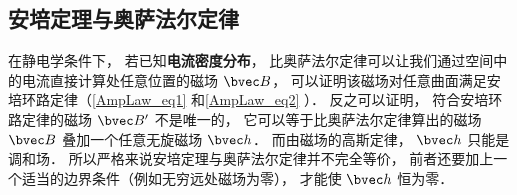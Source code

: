 \subsection{安培定理与奥萨法尔定律}

在静电学条件下， 若已知\textbf{电流密度分布}， 比奥萨法尔定律可以让我们通过空间中的电流直接计算处任意位置的磁场 $\bvec B$， 可以证明该磁场对任意曲面满足安培环路定律（\autoref{AmpLaw_eq1} 和\autoref{AmpLaw_eq2} ）． 反之可以证明， 符合安培环路定律的磁场 $\bvec B'$ 不是唯一的， 它可以等于比奥萨法尔定律算出的磁场 $\bvec B$ 叠加一个任意无旋磁场 $\bvec h$． 而由磁场的高斯定律， $\bvec h$ 只能是调和场． 所以严格来说安培定理与奥萨法尔定律并不完全等价， 前者还要加上一个适当的边界条件（例如无穷远处磁场为零）， 才能使 $\bvec h$ 恒为零．
